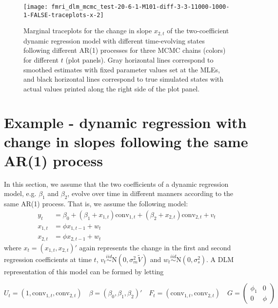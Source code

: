 \documentclass{article}
\begin{document}
\begin{figure}[ht]
\texttt{[image: fmri\_dlm\_mcmc\_test-20-6-1-M101-diff-3-3-11000-1000-1-FALSE-traceplots-x-2]}
\caption{Marginal traceplots for the change in slope $x_{2,t}$ of the two-coefficient dynamic regression model with different time-evolving states following different AR(1) processes for three MCMC chains (colors) for different $t$ (plot panels). Gray horizontal lines correspond to smoothed estimates with fixed parameter values set at the MLEs, and black horizontal lines correspond to true simulated states with actual values printed along the right side of the plot panel.} \label{fig:tracex-drdiff2}
\end{figure}

\clearpage

\section{Example - dynamic regression with change in slopes following the same AR(1) process}

In this section, we assume that the two coefficients of a dynamic regression model, e.g. $\beta_1$ and $\beta_2$, evolve over time in different manners according to the same AR(1) process. That is, we assume the following model:
\begin{align*}
y_t &= \beta_0 + (\beta_1 + x_{1,t})\mbox{conv}_{1,t} + (\beta_2 + x_{2,t})\mbox{conv}_{2,t} + v_t \\
x_{1,t} &= \phi x_{1,t-1} + w_t \\
x_{2,t} &= \phi x_{2,t-1} + w_t
\end{align*}
\noindent where $x_t = (x_{1,t}, x_{2,t})'$ again represents the change in the first and second regression coefficients at time $t$, $v_t \stackrel{iid}{\sim} \mbox{N}(0,\sigma^2_m\tilde{V})$ and $w_t \stackrel{iid}{\sim} \mbox{N}(0,\sigma^2_s)$. A DLM representation of this model can be formed by letting

\begin{equation}
U_t = (1, \mbox{conv}_{1,t}, \mbox{conv}_{2,t}) \quad \beta = (\beta_0,\beta_1,\beta_2)' \quad F_t = (\mbox{conv}_{1,t}, \mbox{conv}_{2,t}) \quad G = \left( \begin{array}{cc} \phi_1 & 0 \\ 0 & \phi \end{array} \right) \label{eqn:dr}
\end{equation}
\end{document}
